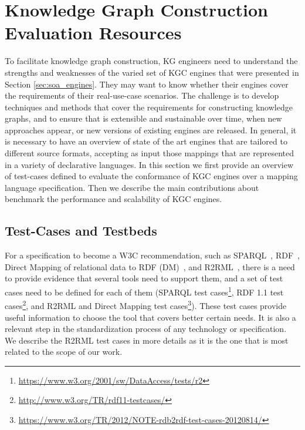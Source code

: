 \section{Knowledge Graph Construction Evaluation Resources}
\label{sec:soa_evaluations}
To facilitate knowledge graph construction, KG engineers need to understand the strengths and weaknesses of the varied set of KGC engines that were presented in Section \ref{sec:soa_engines}. They may want to know whether their engines cover the requirements of their real-use-case scenarios. The challenge is to develop techniques and methods that cover the requirements for constructing knowledge graphs, and to ensure that is extensible and sustainable over time, when new approaches appear, or new versions of existing engines are released. In general, it is necessary to have an overview of state of the art engines that are tailored to different source formats, accepting as input those mappings that are represented in a variety of declarative languages. In this section we first provide an overview of test-cases defined to evaluate the conformance of KGC engines over a mapping language specification. Then we describe the main contributions about benchmark the performance and scalability of KGC engines.


\subsection{Test-Cases and Testbeds}
For a specification to become a W3C recommendation, such as SPARQL~\citep{SPARQL}, RDF~\citep{RDF}, Direct Mapping of relational data to RDF (DM)~\citep{directMapping}, and R2RML~\citep{R2RML}, there is a need to provide evidence that several tools need to support them, and a set of test cases need to be defined for each of them (SPARQL test cases\footnote{ \url{https://www.w3.org/2001/sw/DataAccess/tests/r2}}, RDF 1.1 test cases\footnote{ \url{http://www.w3.org/TR/rdf11-testcases/}}, and R2RML and Direct Mapping test cases\footnote{\url{https://www.w3.org/TR/2012/NOTE-rdb2rdf-test-cases-20120814/}}). These test cases provide useful information to choose the tool that covers better certain needs. It is also a relevant step in the standardization process of any technology or specification. We describe the R2RML test cases in more details as it is the one that is most related to the scope of our work.

